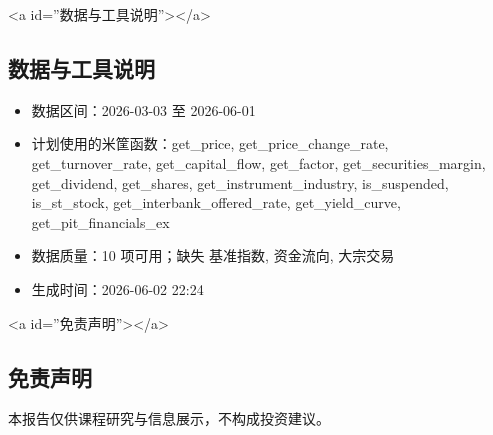 \documentclass[12pt,a4paper]{article}
\begin{document}
<a id=''数据与工具说明''></a>

\subsection{ 数据与工具说明}
\begin{itemize}
\item 数据区间：2026-03-03 至 2026-06-01
\item 计划使用的米筐函数：get\_price, get\_price\_change\_rate, get\_turnover\_rate, get\_capital\_flow, get\_factor, get\_securities\_margin, get\_dividend, get\_shares, get\_instrument\_industry, is\_suspended, is\_st\_stock, get\_interbank\_offered\_rate, get\_yield\_curve, get\_pit\_financials\_ex
\item 数据质量：10 项可用；缺失 基准指数, 资金流向, 大宗交易
\item 生成时间：2026-06-02 22:24
\end{itemize}

<a id=''免责声明''></a>

\subsection{ 免责声明}
本报告仅供课程研究与信息展示，不构成投资建议。
\end{document}
